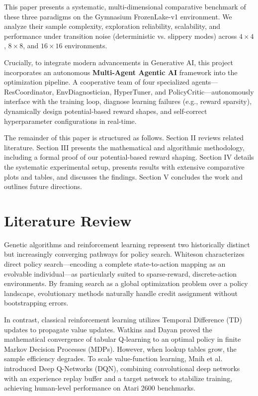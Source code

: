 \documentclass[conference]{IEEEtran}
\begin{document}
This paper presents a systematic, multi-dimensional comparative benchmark of these three paradigms on the Gymnasium FrozenLake-v1 environment. We analyze their sample complexity, exploration reliability, scalability, and performance under transition noise (deterministic vs. slippery modes) across $4\times4$, $8\times8$, and $16\times16$ environments. 

Crucially, to integrate modern advancements in Generative AI, this project incorporates an autonomous \textbf{Multi-Agent Agentic AI} framework into the optimization pipeline. A cooperative team of four specialized agents---ResCoordinator, EnvDiagnostician, HyperTuner, and PolicyCritic---autonomously interface with the training loop, diagnose learning failures (e.g., reward sparsity), dynamically design potential-based reward shapes, and self-correct hyperparameter configurations in real-time.

The remainder of this paper is structured as follows. Section II reviews related literature. Section III presents the mathematical and algorithmic methodology, including a formal proof of our potential-based reward shaping. Section IV details the systematic experimental setup, presents results with extensive comparative plots and tables, and discusses the findings. Section V concludes the work and outlines future directions.

\section{Literature Review}

Genetic algorithms and reinforcement learning represent two historically distinct but increasingly converging pathways for policy search. Whiteson \cite{b1} characterizes direct policy search---encoding a complete state-to-action mapping as an evolvable individual---as particularly suited to sparse-reward, discrete-action environments. By framing search as a global optimization problem over a policy landscape, evolutionary methods naturally handle credit assignment without bootstrapping errors. 

In contrast, classical reinforcement learning utilizes Temporal Difference (TD) updates to propagate value updates. Watkins and Dayan \cite{b2} proved the mathematical convergence of tabular Q-learning to an optimal policy in finite Markov Decision Processes (MDPs). However, when lookup tables grow, the sample efficiency degrades. To scale value-function learning, Mnih et al. \cite{b3} introduced Deep Q-Networks (DQN), combining convolutional deep networks with an experience replay buffer and a target network to stabilize training, achieving human-level performance on Atari 2600 benchmarks.
\end{document}
